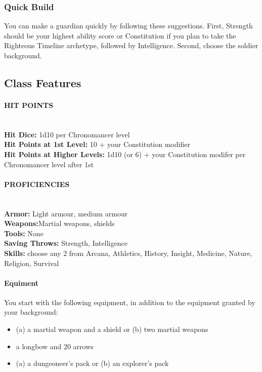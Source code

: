 \subsubsection{Quick Build}

You can make a guardian quickly by following these suggestions. First, Strength should be your highest ability score or Constitution if you plan to take the Righteous Timeline archetype, followed by Intelligence. Second, choose the soldier background.

\subsection{Class Features}

\paragraph{HIT POINTS}\mbox{}\\
\textbf{Hit Dice:} 1d10 per Chronomancer level\\
\textbf{Hit Points at 1st Level:} 10 + your Constitution modifier\\
\textbf{Hit Points at Higher Levels:} 1d10 (or 6) + your  Constitution modifer per Chronomancer level after 1st

\paragraph{PROFICIENCIES}\mbox{}\\
\textbf{Armor:} Light armour, medium armour\\
\textbf{Weapons:}Martial weapons, shields\\
\textbf{Tools:} None\\
\textbf{Saving Throws:} Strength, Intelligence\\
\textbf{Skills:} choose any 2 from Arcana, Athletics, History, Insight, Medicine, Nature, Religion, Survival

\paragraph{Equiment}

You start with the following equipment, in addition to the equipment granted by your background:
\begin{itemize}
\item (a) a martial weapon and a shield or (b) two martial weapons
\item a longbow and 20 arrows
\item (a) a dungeoneer's pack or (b) an explorer's pack
\end{itemize}

